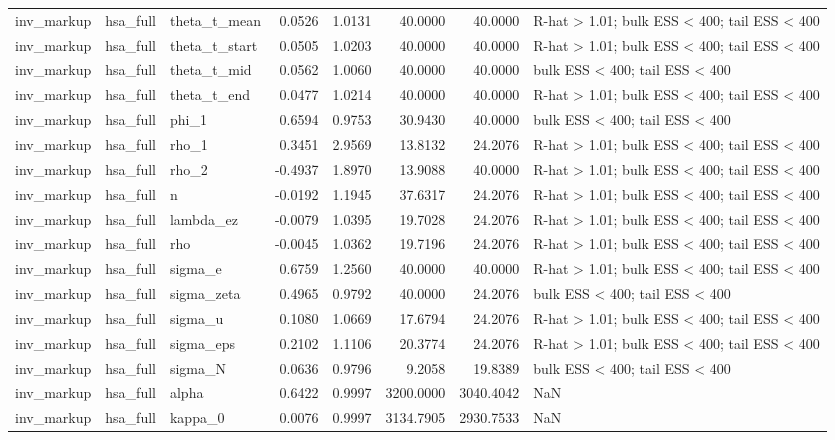 \begin{tabular}{lllrrrrl}
inv\_markup & hsa\_full & theta\_t\_mean & 0.0526 & 1.0131 & 40.0000 & 40.0000 & R-hat > 1.01; bulk ESS < 400; tail ESS < 400 \\
inv\_markup & hsa\_full & theta\_t\_start & 0.0505 & 1.0203 & 40.0000 & 40.0000 & R-hat > 1.01; bulk ESS < 400; tail ESS < 400 \\
inv\_markup & hsa\_full & theta\_t\_mid & 0.0562 & 1.0060 & 40.0000 & 40.0000 & bulk ESS < 400; tail ESS < 400 \\
inv\_markup & hsa\_full & theta\_t\_end & 0.0477 & 1.0214 & 40.0000 & 40.0000 & R-hat > 1.01; bulk ESS < 400; tail ESS < 400 \\
inv\_markup & hsa\_full & phi\_1 & 0.6594 & 0.9753 & 30.9430 & 40.0000 & bulk ESS < 400; tail ESS < 400 \\
inv\_markup & hsa\_full & rho\_1 & 0.3451 & 2.9569 & 13.8132 & 24.2076 & R-hat > 1.01; bulk ESS < 400; tail ESS < 400 \\
inv\_markup & hsa\_full & rho\_2 & -0.4937 & 1.8970 & 13.9088 & 40.0000 & R-hat > 1.01; bulk ESS < 400; tail ESS < 400 \\
inv\_markup & hsa\_full & n & -0.0192 & 1.1945 & 37.6317 & 24.2076 & R-hat > 1.01; bulk ESS < 400; tail ESS < 400 \\
inv\_markup & hsa\_full & lambda\_ez & -0.0079 & 1.0395 & 19.7028 & 24.2076 & R-hat > 1.01; bulk ESS < 400; tail ESS < 400 \\
inv\_markup & hsa\_full & rho & -0.0045 & 1.0362 & 19.7196 & 24.2076 & R-hat > 1.01; bulk ESS < 400; tail ESS < 400 \\
inv\_markup & hsa\_full & sigma\_e & 0.6759 & 1.2560 & 40.0000 & 40.0000 & R-hat > 1.01; bulk ESS < 400; tail ESS < 400 \\
inv\_markup & hsa\_full & sigma\_zeta & 0.4965 & 0.9792 & 40.0000 & 24.2076 & bulk ESS < 400; tail ESS < 400 \\
inv\_markup & hsa\_full & sigma\_u & 0.1080 & 1.0669 & 17.6794 & 24.2076 & R-hat > 1.01; bulk ESS < 400; tail ESS < 400 \\
inv\_markup & hsa\_full & sigma\_eps & 0.2102 & 1.1106 & 20.3774 & 24.2076 & R-hat > 1.01; bulk ESS < 400; tail ESS < 400 \\
inv\_markup & hsa\_full & sigma\_N & 0.0636 & 0.9796 & 9.2058 & 19.8389 & bulk ESS < 400; tail ESS < 400 \\
inv\_markup & hsa\_full & alpha & 0.6422 & 0.9997 & 3200.0000 & 3040.4042 & NaN \\
inv\_markup & hsa\_full & kappa\_0 & 0.0076 & 0.9997 & 3134.7905 & 2930.7533 & NaN \\

\end{tabular}
